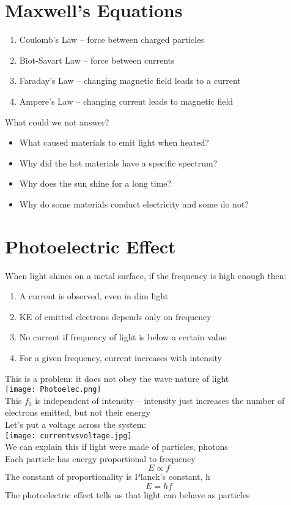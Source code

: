 \documentclass[a4paper, 11pt, fleqn, normalem]{report}
\begin{document}
\section{Maxwell's Equations}
\begin{enumerate}
    \item Coulomb's Law -- force between charged particles
    \item Biot-Savart Law -- force between currents
    \item Faraday's Law -- changing magnetic field leads to a current
    \item Ampere's Law -- changing current leads to magnetic field
\end{enumerate}
What could we not answer?
\begin{itemize}
    \item What caused materials to emit light when heated?
    \item Why did the hot materials have a specific spectrum?
    \item Why does the sun shine for a long time?
    \item Why do some materials conduct electricity and some do not?
\end{itemize}

\section{Photoelectric Effect}
When light shines on a metal surface, if the frequency is high enough then:
\begin{enumerate}
    \item A current is observed, even in dim light
    \item KE of emitted electrons depends only on frequency
    \item No current if frequency of light is below a certain value
    \item For a given frequency, current increases with intensity
\end{enumerate}
This is a problem: it does not obey the wave nature of light \\
\texttt{[image: Photoelec.png]} \\
This $f_{0}$ is independent of intensity -- intensity just increases the number of electrons emitted, but not their energy \\
Let's put a voltage across the system: \\
\texttt{[image: currentvsvoltage.jpg]} \\
We can explain this if light were made of particles, photons \\
Each particle has energy proportional to frequency
\begin{equation*}
    E \propto f
\end{equation*}
The constant of proportionality is Planck's constant, h
\begin{equation*}
    E = hf
\end{equation*}
The photoelectric effect tells us that light can behave as particles
\end{document}
